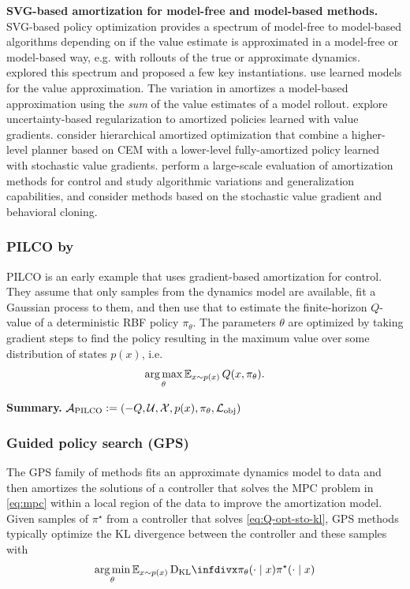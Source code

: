 \documentclass[twoside,11pt]{article}
\newcommand{\eg}{e.g.\xspace}
\newcommand{\ie}{i.e.\xspace}
\begin{document}
\textbf{SVG-based amortization for model-free and model-based methods.}
SVG-based policy optimization provides a spectrum of model-free
to model-based algorithms depending on if the value estimate is
approximated in a model-free or model-based way, \eg with rollouts
of the true or approximate dynamics.
\citet{heess2015learning} explored this spectrum and proposed
a few key instantiations.
\citet{byravan2019imagined,amos2021model} use learned
models for the value approximation.
The variation in \citet{hafner2019dream} amortizes a model-based
approximation using the \emph{sum} of the value estimates
of a model rollout.
\citet{henaff2019model} explore uncertainty-based regularization to
amortized policies learned with value gradients.
\citet{xie2020latent} consider hierarchical amortized optimization
that combine a higher-level planner based on CEM with a
lower-level fully-amortized policy learned
with stochastic value gradients.
\citet{byravan2021evaluating} perform a large-scale evaluation of
amortization methods for control and study algorithmic variations
and generalization capabilities, and consider methods based on
the stochastic value gradient and behavioral cloning.

\subsubsection{PILCO by \citet{deisenroth2011pilco}}
PILCO is an early example that uses gradient-based
amortization for control.
They assume that only samples from the dynamics model are
available, fit a Gaussian process to them, and then use that
to estimate the finite-horizon $Q$-value of a
deterministic RBF policy $\pi_\theta$.
The parameters $\theta$ are optimized by taking gradient
steps to find the policy resulting in the maximum value
over some distribution of states $p(x)$, \ie
\begin{equation}
  \operatorname*{arg\,max}_\theta \operatorname{\mathbb{E}}_{x\sim p(x)} Q(x, \pi_\theta).
\end{equation}

\textbf{Summary.}
${\mathcal{A}}_{\rm PILCO}\vcentcolon= (-Q, {\mathcal{U}}, {\mathcal{X}}, p(x), \pi_\theta, {\mathcal{L}}_{\rm obj})$

\subsubsection{Guided policy search (GPS)}
The GPS family of methods
\citep{levine2013guided,levine2014learning,levine2016end,montgomery2016guided}
fits an approximate dynamics model to data and then
amortizes the solutions of a controller that solves
the MPC problem in \cref{eq:mpc} within a local region of
the data to improve the amortization model.
Given samples of $\pi^\star$ from a controller that solves
\cref{eq:Q-opt-sto-kl},
GPS methods typically optimize the KL divergence between
the controller and these samples with
\begin{equation}
  \argmin_\theta \E_{x\sim p(x)} \kl{\pi_\theta(\cdot\mid x)}{\pi^\star(\cdot\mid x)}
  \label{eq:gps}
\end{equation}
\end{document}
